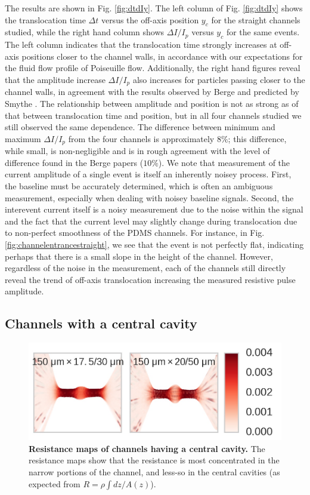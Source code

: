 				The results are shown in Fig. \ref{fig:dtdIy}. The left column of Fig. \ref{fig:dtdIy} shows the translocation time $\Delta t$ versus the off-axis position $y_{c}$ for the straight channels studied, while the right hand column shows $\Delta I/I_{p}$ versus $y_{c}$ for the same events. The left column indicates that the translocation time strongly increases at off-axis positions closer to the channel walls, in accordance with our expectations for the fluid flow profile of Poiseuille flow. Additionally, the right hand figures reveal that the amplitude increase $\Delta I/I_{p}$ also increases for particles passing closer to the channel walls, in agreement with the results observed by Berge \cite{Berge1990} and predicted by Smythe \cite{Smythe1972}. The relationship between amplitude and position is not as strong as of that between translocation time and position, but in all four channels studied we still observed the same dependence. The difference between minimum and maximum $\Delta I/I_{p}$ from the four channels is approximately $8\%$; this difference, while small, is non-negligible and is in rough agreement with the level of difference found in the Berge papers ($10\%$). We note that measurement of the current amplitude of a single event is itself an inherently noisey process. First, the baseline must be accurately determined, which is often an ambiguous measurement, especially when dealing with noisey baseline signals. Second, the interevent current itself is a noisy measurement due to the noise within the signal and the fact that the current level may slightly change during translocation due to non-perfect smoothness of the PDMS channels. For instance, in Fig. \ref{fig:channelentrancestraight}, we see that the event is not perfectly flat, indicating perhaps that there is a small slope in the height of the channel. However, regardless of the noise in the measurement, each of the channels still directly reveal the trend of off-axis translocation increasing the measured resistive pulse amplitude.
				
				
				
		\subsection{Channels with a central cavity}
		
			\begin{figure}
				\includegraphics[width=\textwidth]{resistancemaps_cavity}
				\caption{\textbf{Resistance maps of channels having a central cavity.} The resistance maps show that the resistance is most concentrated in the narrow portions of the channel, and less-so in the central cavities (as expected from $R=\rho\int dz/A\left(z\right)$).}
			\end{figure}

